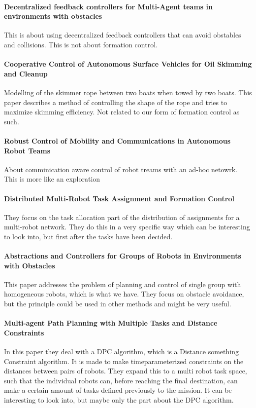 \paragraph{Decentralized feedback controllers for Multi-Agent teams in environments with obstacles}
	This is about using decentralized feedback controllers that can
	avoid obstables and collisions. This is not about formation control.

\paragraph{Cooperative Control of Autonomous Surface Vehicles for Oil Skimming and Cleanup}
	Modelling of the skimmer rope between two boats when towed by two
	boats. This paper describes a method of controlling the shape of the
	rope and tries to maximize skimming efficiency. Not related to our
	form of formation control as such.

\paragraph{Robust Control of Mobility and Communications in Autonomous Robot Teams}
	About comminication aware control of robot treams with an ad-hoc
	netowrk. This is more like an exploration 

\paragraph{Distributed Multi-Robot Task Assignment and Formation Control}
They focus on the task allocation part of the distribution of assignments for a multi-robot network. They do this in a very specific way which can be interesting to look into, but first after the tasks have been decided.

\paragraph{Abstractions and Controllers for Groups of Robots in Environments with Obstacles}
This paper addresses the problem of planning and control of single group with homogeneous robots, which is what we have. They focus on obstacle avoidance, but the principle could be used in other methods and might be very useful.

\paragraph{Multi-agent Path Planning with Multiple Tasks and Distance Constraints}
In this paper they deal with a DPC algorithm, which is a Distance something Constraint algorithm. It is made to make timeparameterized constraints on the distances between pairs of robots. They expand this to a multi robot task space, such that the individual robots can, before reaching the final destination, can make a certain amount of tasks defined previously to the mission.
It can be interesting to look into, but maybe only the part about the DPC algorithm.

